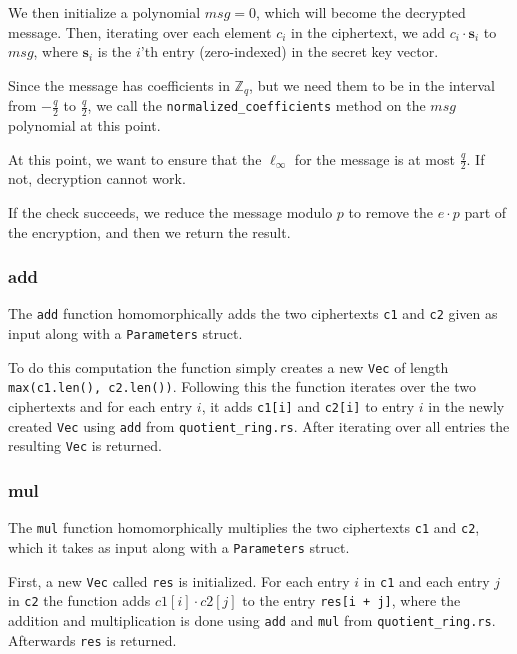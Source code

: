 \documentclass[../main.tex]{subfiles}
\begin{document}
We then initialize a polynomial $msg = 0$, which will become the decrypted message.
Then, iterating over each element $c_i$ in the ciphertext, we add $c_i \cdot \mathbf{s}_i$ to $msg$, where $\mathbf{s}_i$ is the $i$'th entry (zero-indexed) in the secret key vector.

Since the message has coefficients in $\mathbb{Z}_q$, but we need them to be in the interval from $-\frac{q}{2}$ to $\frac{q}{2}$, we call the \lstinline{normalized_coefficients} method on the $msg$ polynomial at this point.

At this point, we want to ensure that the $\ell_\infty$ for the message is at most $\frac{q}{2}$.
If not, decryption cannot work.

If the check succeeds, we reduce the message modulo $p$ to remove the $e \cdot p$ part of the encryption, and then we return the result.

\subsubsection{add}
The \lstinline{add} function homomorphically adds the two ciphertexts \lstinline{c1} and \lstinline{c2} given as input along with a \lstinline{Parameters} struct.

To do this computation the function simply creates a new \lstinline{Vec} of length \lstinline{max(c1.len(), c2.len())}.
Following this the function iterates over the two ciphertexts and for each entry $i$, it adds \lstinline{c1[i]} and \lstinline{c2[i]} to entry $i$ in the newly created \lstinline{Vec} using \lstinline{add} from \lstinline{quotient_ring.rs}. After iterating over all entries the resulting \lstinline{Vec} is returned.

\subsubsection{mul}
The \lstinline{mul} function homomorphically multiplies the two ciphertexts \lstinline{c1} and \lstinline{c2}, which it takes as input along with a \lstinline{Parameters} struct.

First, a new \lstinline{Vec} called \lstinline{res} is initialized.
For each entry $i$ in \lstinline{c1} and each entry $j$ in \lstinline{c2} the function adds $c1[i] \cdot c2[j]$ to the entry \lstinline{res[i + j]}, where the addition and multiplication is done using \lstinline{add} and \lstinline{mul} from \lstinline{quotient_ring.rs}.
Afterwards \lstinline{res} is returned.
\end{document}
